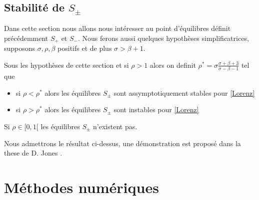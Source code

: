 \documentclass{article}
\newtheorem[M , nocut]{prop}{Proposition}[section]
\newtheorem[M , nocut]{definition}{Définition}
\newtheorem[M , nocut]{lemme}{Lemme}
\newtheorem[L , nocut]{thm}{Théoreme}
\newtheorem[M , nocut]{cor}{Corollaire}
\begin{document}
\subsection{Stabilité de $S_\pm$}

Dans cette section nous allons nous intéresser au point d'équilibres définit précédemment $S_+$ et $S_-$. Nous ferons aussi quelques hypothèses simplificatrices, supposons $\sigma,\rho,\beta$ positifs et de plus $\sigma>\beta+1$.

\begin{prop}
    Sous les hypothèses de cette section et si $\rho > 1$ alors on definit $\rho^* = \sigma \frac{\sigma+\beta+3}{\sigma-\beta-1}$ tel que 
    \begin{itemize}
        \item si $\rho < \rho^* $ alors les équilibres $S_\pm$ sont assymptotiquement stables pour \eqref{Lorenz}
        \item si $\rho > \rho^* $ alors les équilibres $S_\pm$ sont instables pour \eqref{Lorenz}
    \end{itemize}
\end{prop}

\begin{example}[Remarque]
    Si $\rho \in [0,1[$ les équilibres $S_\pm$ n'existent pas.
\end{example}

Nous admettrons le résultat ci-dessus, une démonstration est proposé dans la these de D. Jones \cite{daniel_jones_stability_2009}.

\newpage
\section{Méthodes numériques}
\end{document}
